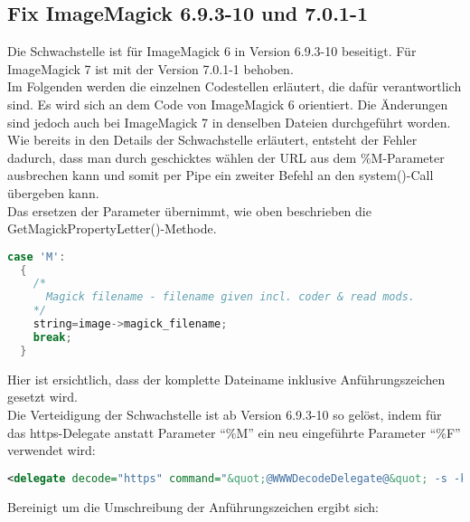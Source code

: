 \subsection{Fix ImageMagick 6.9.3-10 und 7.0.1-1}\label{subsec:fix-imagemagick-6.9.3-10}

Die Schwachstelle ist für ImageMagick 6 in Version 6.9.3-10 beseitigt.
Für ImageMagick 7 ist mit der Version 7.0.1-1 behoben.\\
Im Folgenden werden die einzelnen Codestellen erläutert, die dafür verantwortlich sind.
Es wird sich an dem Code von ImageMagick 6 orientiert.
Die Änderungen sind jedoch auch bei ImageMagick 7 in denselben Dateien durchgeführt worden.  \\

Wie bereits in den Details der Schwachstelle erläutert, entsteht der Fehler dadurch, dass man durch geschicktes wählen der URL aus dem \%M-Parameter ausbrechen kann und somit per Pipe ein zweiter Befehl an den system()-Call übergeben kann.\\

Das ersetzen der Parameter übernimmt, wie oben beschrieben die GetMagickPropertyLetter()-Methode.

\begin{lstlisting}[firstnumber=2627, language=C, caption=magick/property.c Ungefilterte Weitergabe M-Parameter,label={lst:lstlisting}]
  case 'M':
  {
    /*
      Magick filename - filename given incl. coder & read mods.
    */
    string=image->magick_filename;
    break;
  }
\end{lstlisting}
\vspace{5mm}

Hier ist ersichtlich, dass der komplette Dateiname inklusive Anführungszeichen gesetzt wird.\\

Die Verteidigung der Schwachstelle ist ab Version 6.9.3-10 so gelöst, indem für das https-Delegate anstatt Parameter "`\%M"' ein neu eingeführte Parameter "`\%F"' verwendet wird:\\

\begin{lstlisting}[firstnumber=91, language=XML, caption=config/delegates.xml.in https-Delegate 6.9.3-10,label={lst:lstlisting}]
  <delegate decode="https" command="&quot;@WWWDecodeDelegate@&quot; -s -k -L -o &quot;%o&quot; &quot;https:%F&quot;"/>
\end{lstlisting}
\vspace{5mm}

Bereinigt um die Umschreibung der Anführungszeichen ergibt sich:\\

